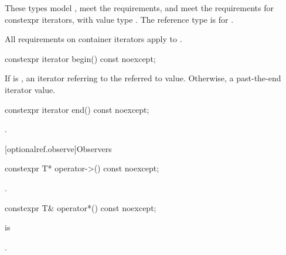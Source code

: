 \begin{addedblock}
\begin{itemdescr}
\pnum
These types
model ,
meet the  requirements, and
meet the requirements for constexpr iterators,
with value type .
The reference type is  for .

\pnum
All requirements on container iterators apply to
.

\end{itemdescr}


\begin{itemdecl}
constexpr iterator begin() const noexcept;
\end{itemdecl}

\begin{itemdescr}
  \pnum
  \returns
  If  is ,
  an iterator referring to the referred to value.
  Otherwise, a past-the-end iterator value.

\end{itemdescr}

\begin{itemdecl}
constexpr iterator end() const noexcept;
\end{itemdecl}

\begin{itemdescr}
\pnum
\returns
{}.
\end{itemdescr}



[optionalref.observe]{Observers}

\begin{itemdecl}
constexpr T* operator->() const noexcept;
\end{itemdecl}

\begin{itemdescr}
  \pnum
  \returns
  .

\end{itemdescr}

\begin{itemdecl}
constexpr T& operator*() const noexcept;
\end{itemdecl}

\begin{itemdescr}
   \pnum
   \expects
    is 

   \pnum
   \returns
   .


\end{itemdescr}
\end{addedblock}
